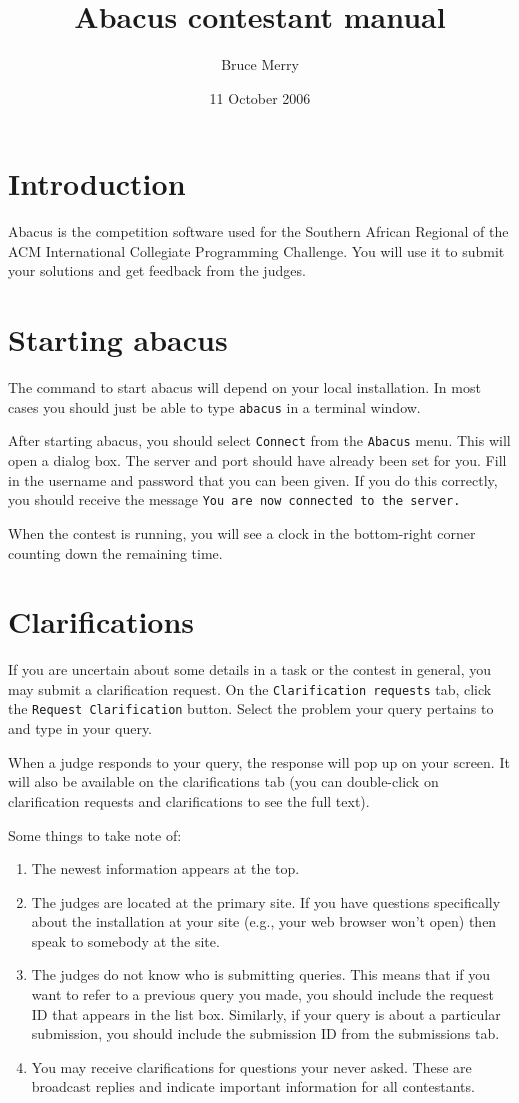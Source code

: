 \documentclass[a4paper]{article}
\title{Abacus contestant manual}
\author{Bruce Merry}
\date{11 October 2006}
\begin{document}
\maketitle
\section{Introduction}
Abacus is the competition software used for the Southern African
Regional of the ACM International Collegiate Programming Challenge. You
will use it to submit your solutions and get feedback from the judges.

\section{Starting abacus}
The command to start abacus will depend on your local installation. In
most cases you should just be able to type \texttt{abacus} in a
terminal window.

After starting abacus, you should select \texttt{Connect} from the
\texttt{Abacus} menu. This will open a dialog box. The server and port
should have already been set for you. Fill in the username and password
that you can been given. If you do this correctly, you should receive
the message \texttt{You are now connected to the server.}

When the contest is running, you will see a clock in the bottom-right
corner counting down the remaining time.

\section{Clarifications}
If you are uncertain about some details in a task or the contest in
general, you may submit a clarification request. On the
\texttt{Clarification requests} tab, click the \texttt{Request
Clarification} button. Select the problem your query pertains to and
type in your query.

When a judge responds to your query, the response will pop up on your
screen. It will also be available on the clarifications tab (you can
double-click on clarification requests and clarifications to see the
full text).

Some things to take note of:
\begin{enumerate}
\item The newest information appears at the top.
\item The judges are located at the primary site. If you have questions
specifically about the installation at your site (e.g., your web
browser won't open) then speak to somebody at the site.
\item The judges do not know who is submitting queries. This means
that if you want to refer to a previous query you made, you should
include the request ID that appears in the list box. Similarly, if your
query is about a particular submission, you should include the
submission ID from the submissions tab.
\item You may receive clarifications for questions your never asked.
These are broadcast replies and indicate important information for all
contestants.
\end{enumerate}
\end{document}

